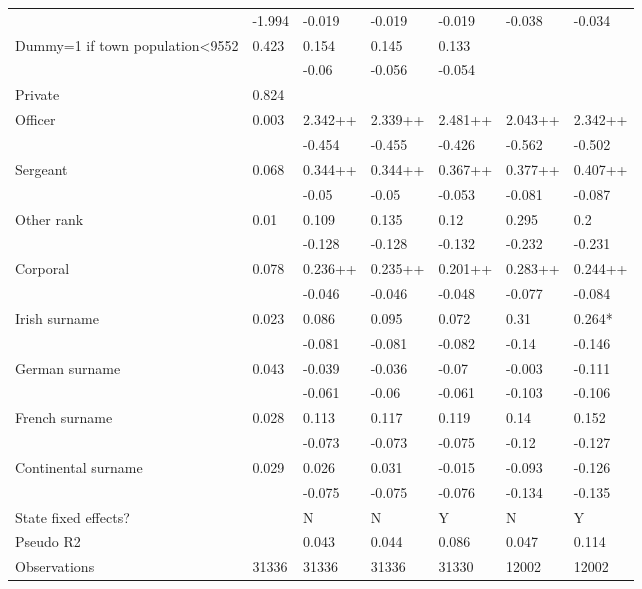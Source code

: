 \documentclass{article}
\begin{document}
\begin{table}
\begin{tabular}{lllllll}
                                                 & -1.994  & -0.019  & -0.019  & -0.019  & -0.038                              & -0.034 \\
Dummy=1 if town population<9552                  & 0.423   & 0.154   & 0.145   & 0.133   &                                     &  \\
                                                 &         & -0.06   & -0.056  & -0.054  &                                     &  \\
Private                                          & 0.824   &         &         &         &                                     &  \\
Officer & 0.003 & 2.342++ & 2.339++ & 2.481++ & 2.043++ & 2.342++ \\
        &       & -0.454  & -0.455  & -0.426  & -0.562  & -0.502  \\
Sergeant             & 0.068 & 0.344++ & 0.344++ & 0.367++ & 0.377++ & 0.407++ \\
                     &       & -0.05   & -0.05   & -0.053  & -0.081  & -0.087  \\
Other rank           & 0.01  & 0.109   & 0.135   & 0.12    & 0.295   & 0.2     \\
                     &       & -0.128  & -0.128  & -0.132  & -0.232  & -0.231  \\
Corporal             & 0.078 & 0.236++ & 0.235++ & 0.201++ & 0.283++ & 0.244++ \\
                     &       & -0.046  & -0.046  & -0.048  & -0.077  & -0.084  \\
Irish surname        & 0.023 & 0.086   & 0.095   & 0.072   & 0.31    & 0.264*  \\
                     &       & -0.081  & -0.081  & -0.082  & -0.14   & -0.146  \\
German surname       & 0.043 & -0.039  & -0.036  & -0.07   & -0.003  & -0.111  \\
                     &       & -0.061  & -0.06   & -0.061  & -0.103  & -0.106  \\
French surname       & 0.028 & 0.113   & 0.117   & 0.119   & 0.14    & 0.152   \\
                     &       & -0.073  & -0.073  & -0.075  & -0.12   & -0.127  \\
Continental surname  & 0.029 & 0.026   & 0.031   & -0.015  & -0.093  & -0.126  \\
                     &       & -0.075  & -0.075  & -0.076  & -0.134  & -0.135  \\
State fixed effects? &       & N       & N       & Y       & N       & Y       \\
Pseudo R2            &       & 0.043   & 0.044   & 0.086   & 0.047   & 0.114   \\
Observations         & 31336 & 31336   & 31336   & 31330   & 12002   & 12002   \\
\end{tabular}
\end{table}
\end{document}
